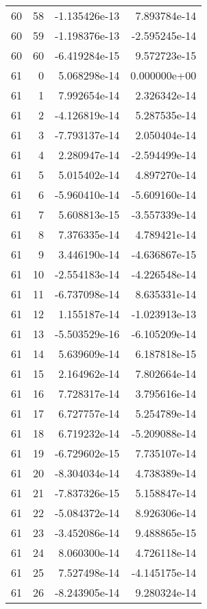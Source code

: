 \begin{tabular}{rrrr}
  60 &   58 & -1.135426e-13 &  7.893784e-14 \\
  60 &   59 & -1.198376e-13 & -2.595245e-14 \\
  60 &   60 & -6.419284e-15 &  9.572723e-15 \\
  61 &    0 &  5.068298e-14 &  0.000000e+00 \\
  61 &    1 &  7.992654e-14 &  2.326342e-14 \\
  61 &    2 & -4.126819e-14 &  5.287535e-14 \\
  61 &    3 & -7.793137e-14 &  2.050404e-14 \\
  61 &    4 &  2.280947e-14 & -2.594499e-14 \\
  61 &    5 &  5.015402e-14 &  4.897270e-14 \\
  61 &    6 & -5.960410e-14 & -5.609160e-14 \\
  61 &    7 &  5.608813e-15 & -3.557339e-14 \\
  61 &    8 &  7.376335e-14 &  4.789421e-14 \\
  61 &    9 &  3.446190e-14 & -4.636867e-15 \\
  61 &   10 & -2.554183e-14 & -4.226548e-14 \\
  61 &   11 & -6.737098e-14 &  8.635331e-14 \\
  61 &   12 &  1.155187e-14 & -1.023913e-13 \\
  61 &   13 & -5.503529e-16 & -6.105209e-14 \\
  61 &   14 &  5.639609e-14 &  6.187818e-15 \\
  61 &   15 &  2.164962e-14 &  7.802664e-14 \\
  61 &   16 &  7.728317e-14 &  3.795616e-14 \\
  61 &   17 &  6.727757e-14 &  5.254789e-14 \\
  61 &   18 &  6.719232e-14 & -5.209088e-14 \\
  61 &   19 & -6.729602e-15 &  7.735107e-14 \\
  61 &   20 & -8.304034e-14 &  4.738389e-14 \\
  61 &   21 & -7.837326e-15 &  5.158847e-14 \\
  61 &   22 & -5.084372e-14 &  8.926306e-14 \\
  61 &   23 & -3.452086e-14 &  9.488865e-15 \\
  61 &   24 &  8.060300e-14 &  4.726118e-14 \\
  61 &   25 &  7.527498e-14 & -4.145175e-14 \\
  61 &   26 & -8.243905e-14 &  9.280324e-14 \\

\end{tabular}
